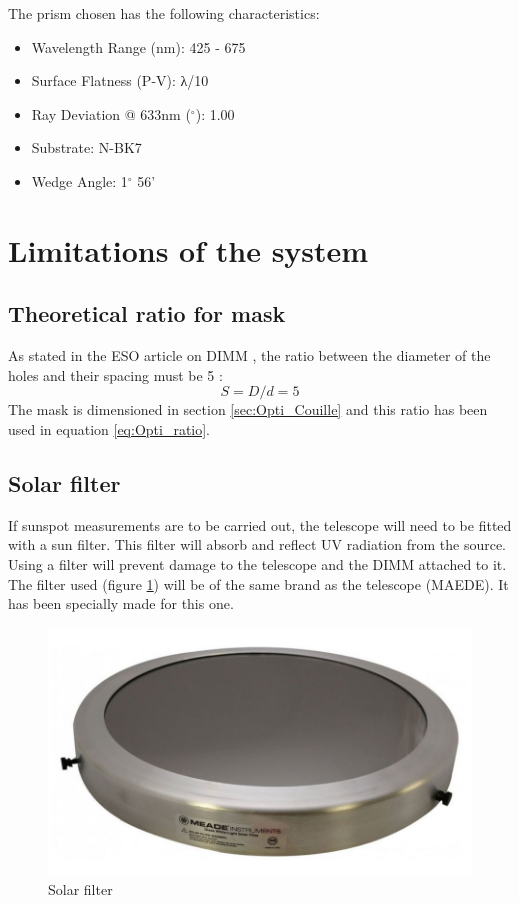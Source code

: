 The prism chosen has the following characteristics:
\begin{itemize}
    \item Wavelength Range (nm): 425 - 675
    \item Surface Flatness (P-V): λ/10
    \item Ray Deviation @ 633nm ($^{\circ}$): 1.00
    \item Substrate: N-BK7
    \item Wedge Angle: 1$^{\circ}$ 56'
\end{itemize}
\newpage
\section{Limitations of the system}\label{sec:Opti_Limit}
\subsection{Theoretical ratio for mask}
As stated in the ESO article on DIMM \cite{DIMM_ESO}, the ratio between the diameter of the holes and their spacing must be 5 :
\begin{equation}
    S = D/d = 5
\end{equation}
The mask is dimensioned in section \ref{sec:Opti_Couille} and this ratio has been used in equation \ref{eq:Opti_ratio}.
\subsection{Solar filter}
If sunspot measurements are to be carried out, the telescope will need to be fitted with a sun filter. This filter will
absorb and reflect UV radiation from the source. Using a filter will prevent damage to the telescope and the DIMM attached to it.
The filter used (figure \ref{fig:Opti_Filter}) will be of the same brand as the telescope (MAEDE). It has been specially made for this one.
\begin{figure}[H]
    \centering
    \includegraphics[scale=0.4]{assets/figures/Optical Design/Solar_filter.png}
    \caption{Solar filter}
    \label{fig:Opti_Filter}
\end{figure}
